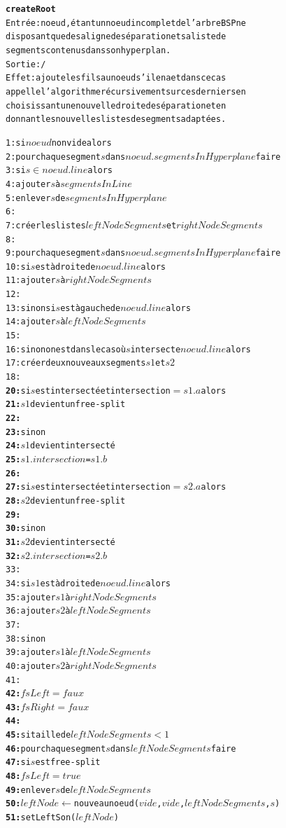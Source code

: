 \documentclass[11pt,a4paper]{article}
\theoremstyle{definition}
\theoremstyle{remark}
\begin{document}
\begin{alltt}
\textbf{createRoot}
Entrée : noeud, étant un noeud incomplet de l'arbre BSP ne
disposant que de sa ligne de séparation et sa liste de
segments contenus dans son hyperplan.
Sortie : /
Effet : ajoute les fils au noeud s'il en a et dans ce cas 
appelle l'algorithme récursivement sur ces derniers en 
choisissant une nouvelle droite de séparation et en 
donnant les nouvelles listes de segments adaptées.

 1: si \(noeud\) non vide alors
 2:   pour chaque segment \(s\) dans \(noeud.segmentsInHyperplane\) faire
 3:     si \(s \in noeud.line\) alors
 4:       ajouter \(s\) à \(segmentsInLine\)
 5:       enlever \(s\) de \(segmentsInHyperplane\)
 6:       
 7:   créer les listes \(leftNodeSegments\) et \(rightNodeSegments\)
 8:   
 9:   pour chaque segment \(s\) dans \(noeud.segmentsInHyperplane\) faire
10:     si \(s\) est à droite de \(noeud.line\) alors
11:       ajouter \(s\) à \(rightNodeSegments\)
12:
13:     sinon si \(s\) est à gauche de \(noeud.line\) alors
14:       ajouter \(s\) à \(leftNodeSegments\)
15:
16:     sinon on est dans le cas où \(s\) intersecte \(noeud.line\) alors
17:       créer deux nouveaux segments \(s1\) et \(s2\)
18:
\textbf{20:}		      si \(s\) est intersecté et intersection \(=s1.a\) alors
\textbf{21:}		        \(s1\) devient un free-split
\textbf{22:}		    
\textbf{23:}		      sinon
\textbf{24:}		        \(s1\) devient intersecté
\textbf{25:}		        \(s1.intersection\) = \(s1.b\)
\textbf{26:}		    
\textbf{27:}		      si \(s\) est intersecté et intersection \(=s2.a\) alors
\textbf{28:}		        \(s2\) devient un free-split
\textbf{29:}		    
\textbf{30:}		      sinon
\textbf{31:}		        \(s2\) devient intersecté
\textbf{32:}		        \(s2.intersection\) = \(s2.b\)
33:		
34:       si \(s1\) est à droite de \(noeud.line\) alors
35:         ajouter \(s1\) à \(rightNodeSegments\)
36:         ajouter \(s2\) à \(leftNodeSegments\)
37:
38:       sinon
39:         ajouter \(s1\) à \(leftNodeSegments\)
40:         ajouter \(s2\) à \(rightNodeSegments\)
41:   
\textbf{42:}	  \(fsLeft = faux\)
\textbf{43:}	  \(fsRight = faux\)
\textbf{44:}      
\textbf{45:}   si taille de \(leftNodeSegments < 1\)
\textbf{46:}     pour chaque segment \(s\) dans \(leftNodeSegments\) faire
\textbf{47:}       si \(s\) est free-split
\textbf{48:}         \(fsLeft = true\)
\textbf{49:}         enlever \(s\) de \(leftNodeSegments\)
\textbf{50:}         \(leftNode \leftarrow \) nouveau noeud (\(vide\), \(vide\), \(leftNodeSegments\), \(s\))
\textbf{51:}         setLeftSon(\(leftNode\))

\end{alltt}
\end{document}
